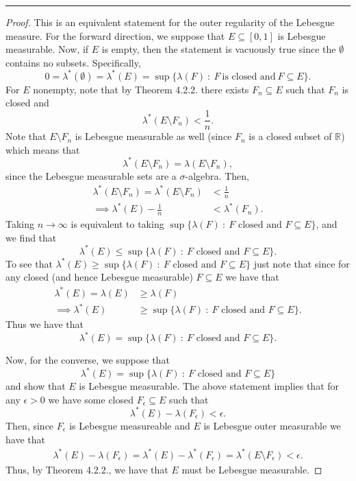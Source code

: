 \documentclass[leqno]{article}
\theoremstyle{nonumberplain}
\newtheorem{proof}{Proof}
\newcommand{\R}{\mathbb{R}}
\begin{document}
\noindent\rule[0.5ex]{\linewidth}{1pt}

\begin{proof}
This is an equivalent statement for the outer regularity of the Lebesgue measure.  For the forward direction, we suppose that $E\subseteq [0,1]$ is Lebesgue measurable.  Now, if $E$ is empty, then the statement is vacuously true since the $\emptyset$ contains no subsets. Specifically,
\[
0=\lambda^*(\emptyset)=\lambda^*(E)=\sup\{ \lambda(F) ~\colon~ F ~\textrm{is closed and}~ F\subseteq E\}.
\]
For $E$ nonempty, note that by Theorem 4.2.2. there exists $F_n\subseteq E$ such that $F_n$ is closed and
\[
\lambda^*(E\setminus F_n ) < \frac{1}{n}.
\] 
Note that $E\setminus F_n$ is Lebesgue measurable as well (since $F_n$ is a closed subset of $\R$) which means that
\[
\lambda^*(E\setminus F_n)=\lambda(E\setminus F_n),
\]
since the Lebesgue measurable sets are a $\sigma$-algebra. Then,
\begin{align*}
\lambda^*(E\setminus F_n)=\lambda^*(E\setminus F_n)&<\frac{1}{n}\\
\implies \lambda^*(E)-\frac{1}{n}&< \lambda^*(F_n).
\end{align*}
Taking $n\to \infty$ is equivalent to taking $\sup\{ \lambda(F) ~\colon~ F \textrm{~closed and~} F\subseteq E\}$, and we find that
\[
\lambda^*(E)\leq \sup\{ \lambda(F) ~\colon~ F \textrm{~closed and~} F\subseteq E\}.
\]
To see that $\lambda^*(E) \geq \sup\{ \lambda(F) ~\colon~ F \textrm{~closed and~} F\subseteq E\}$ just note that since for any closed (and hence Lebesgue measurable) $F\subseteq E$ we have that
\begin{align*}
\lambda^*(E)=\lambda(E)&\geq \lambda(F)\\
\implies  \lambda^*(E)&\geq \sup\{ \lambda(F) ~\colon~ F \textrm{~closed and~} F\subseteq E\}.
\end{align*}
Thus we have that 
\[
\lambda^*(E)=\sup\{ \lambda(F) ~\colon~ F \textrm{~closed and~} F\subseteq E\}.
\]

Now, for the converse, we suppose that
\[
\lambda^*(E)=\sup\{ \lambda(F) ~\colon~ F \textrm{~closed and~} F\subseteq E\}
\]
and show that $E$ is Lebesgue measurable. The above statement implies that for any $\epsilon>0$ we have some closed $F_\epsilon\subseteq E$ such that
\[
\lambda^*(E)-\lambda(F_\epsilon)<\epsilon.
\]
Then, since $F_\epsilon$ is Lebesgue measureable and $E$ is Lebesgue outer measurable we have that 
\begin{align*}
\lambda^*(E)-\lambda(F_\epsilon)=\lambda^*(E)-\lambda^*(F_\epsilon)= \lambda^*(E\setminus F_\epsilon)<\epsilon.
\end{align*}
Thus, by Theorem 4.2.2., we have that $E$ must be Lebesgue measurable.


\end{proof}
\end{document}
